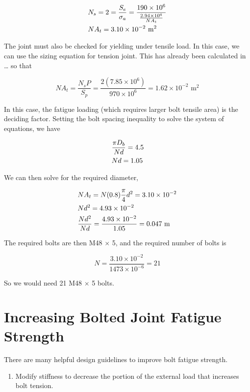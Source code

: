\documentclass[a4paper,openany,12pt]{book}
\begin{document}
{{$$\begin{gathered}
  N_s = 2 = \frac{S_e}{\sigma_a} = \frac{190 \times 10^6}{\frac{2.94 \times 10^6}{NA_t}} \hfill \\
  NA_t = 3.10 \times 10^{-2} \text{ m}^2 \hfill \\ 
\end{gathered}$$

The joint must also be checked for yielding under tensile load. In this
case, we can use the sizing equation for tension joint. This has already
been calculated in \ldots{} so that

$$NA_t = \frac{N_sP}{S_p} = \frac{2(7.85 \times 10^6)}{970 \times 10^6} = 1.62 \times 10^{-2} \text{ m}^2$$

In this case, the fatigue loading (which requires larger bolt tensile
area) is the deciding factor. Setting the bolt spacing inequality to
solve the system of equations, we have

$$\begin{gathered}
  \frac{\pi D_b}{Nd} = 4.5 \hfill \\
  Nd = 1.05 \hfill  \end{gathered}$$

We can then solve for the required diameter,

$$\begin{gathered}
  NA_t = N(0.8)\frac{\pi }{4}d^2 = 3.10 \times 10^{-2} \hfill \\
  Nd^2 = 4.93 \times 10^{-2} \hfill \\
  \frac{Nd^2}{Nd} = \frac{4.93 \times 10^{-2}}{1.05} = 0.047 \text{ m} \hfill\end{gathered}$$

The required bolts are then M48 \(\times\) 5, and the required number of
bolts is

$$N = \frac{3.10 \times 10^{-2}}{1473 \times 10^{-6}} = 21$$

So we would need 21 M48 \(\times\) 5 bolts.

\section{Increasing Bolted Joint Fatigue Strength}
\label{increasing-bolted-joint-fatigue-strength}
There are many helpful design guidelines to improve bolt fatigue
strength.

\begin{enumerate}
\item Modify stiffness to decrease the portion of the external load that
increases bolt tension.


\end{enumerate}}}
\end{document}
